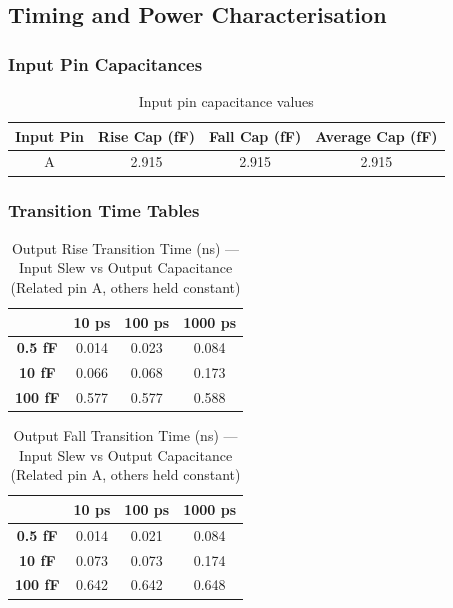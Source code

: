 \documentclass[12pt]{article}
\begin{document}
\subsection{Timing and Power Characterisation}
\subsubsection{Input Pin Capacitances}

\begin{table}[H]
	\centering
	\begin{tabular}{|c|c|c|c|}
		\hline
		\textbf{Input Pin} & \textbf{Rise Cap (fF)} & \textbf{Fall Cap (fF)} & \textbf{Average Cap (fF)} \\
		\hline
		A                  & 2.915                  & 2.915                  & 2.915                     \\
		\hline
	\end{tabular}
	\caption{Input pin capacitance values}
\end{table}

\subsubsection{Transition Time Tables}

\begin{table}[H]
	\centering
	\begin{tabular}{|c|c|c|c|}
		\hline
		                & \textbf{10 ps} & \textbf{100 ps} & \textbf{1000 ps} \\
		\hline
		\textbf{0.5 fF} & 0.014          & 0.023           & 0.084            \\
		\hline
		\textbf{10 fF}  & 0.066          & 0.068           & 0.173            \\
		\hline
		\textbf{100 fF} & 0.577          & 0.577           & 0.588            \\
		\hline
	\end{tabular}
	\caption{Output Rise Transition Time (ns) — Input Slew vs Output Capacitance (Related pin A, others held constant)}
\end{table}

\begin{table}[H]
	\centering
	\begin{tabular}{|c|c|c|c|}
		\hline
		                & \textbf{10 ps} & \textbf{100 ps} & \textbf{1000 ps} \\
		\hline
		\textbf{0.5 fF} & 0.014          & 0.021           & 0.084            \\
		\hline
		\textbf{10 fF}  & 0.073          & 0.073           & 0.174            \\
		\hline
		\textbf{100 fF} & 0.642          & 0.642           & 0.648            \\
		\hline
	\end{tabular}
	\caption{Output Fall Transition Time (ns) — Input Slew vs Output Capacitance (Related pin A, others held constant)}
\end{table}
\end{document}
